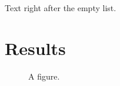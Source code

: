 \documentclass{article}
\begin{document}
\listoffigures
\listoftables
Text right after the empty list.
\section{Results}
\begin{figure}[h]\centering\caption{A figure.}\end{figure}
\end{document}
